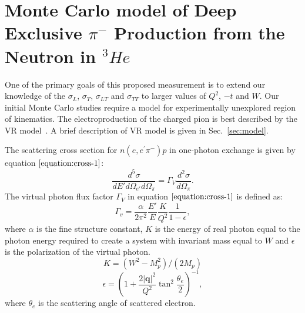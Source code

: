 \section{Monte Carlo model of Deep Exclusive $\pi^{-}$ Production from the
  Neutron in $^{3}He$ }

One of the primary goals of this proposed measurement is to extend our
knowledge of the $\sigma_{L}$, $\sigma_{T}$, $\sigma_{LT}$ and $\sigma_{TT}$ to
larger values of $Q^2$, $-t$ and $W$. Our initial Monte Carlo studies require a
model for experimentally unexplored region of kinematics. The electroproduction
of the charged pion is best described by the VR model~\cite{vr}.  A brief
description of VR model is given in Sec.~\ref{sec:model}. 

The scattering cross section for $n(e,e^{\prime}\pi^{-})p$ in one-photon
exchange is given by equation $\ref{equation:cross-1}$:
\begin{equation}
  \frac{d^{5} \sigma}{dE' d\Omega_{e'} d\Omega_{\pi}} = \Gamma_{V} \frac{d{^2}
\sigma}{d\Omega_{\pi}}.
  \label{equation:cross-1}
\end{equation}
The virtual photon flux factor $\Gamma_{V}$ in equation
$\ref{equation:cross-1}$ is defined as:
\begin{equation}
  \Gamma_v=\frac{\alpha}{2\pi^2} \frac{E'}{E} \frac{K}{Q^2}\frac{1}{1-\epsilon},
  \label{equation:photon-flux-1}
\end{equation}
where $\alpha$ is the fine structure constant, $K$ is the energy of real photon
equal to the photon energy required to create a system with invariant mass
equal to $W$ and $\epsilon$ is the polarization of the virtual photon.
\begin{equation}
  K=(W^2-M_p^2)/(2 M_p)
  \label{equation:photon-flux-2}
\end{equation}
\begin{equation}
  \epsilon=\left(1+\frac{2 |\mathbf{q}|^2}{Q^2} \tan^2\frac{\theta_{e}}{2}
\right)^{-1},
  \label{equation:photon-flux-3}
\end{equation}
where $\theta_{e}$ is the scattering angle of scattered electron.

